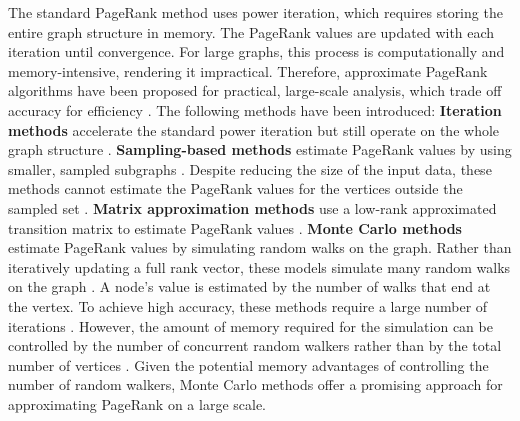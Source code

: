The standard PageRank method uses power iteration, which requires storing the entire graph structure in memory. The PageRank values are updated with each iteration until convergence. For large graphs, this process is computationally and memory-intensive, rendering it impractical. Therefore, approximate PageRank algorithms have been proposed for practical, large-scale analysis, which trade off accuracy for efficiency \cite{wu_efficient_2024}. The following methods have been introduced:
\textbf{Iteration methods} \cite{xie_parameterized_2023-1}\cite{anikin_efficient_2022} accelerate the standard power iteration but still operate on the whole graph structure \cite{wu_efficient_2024}. 
\textbf{Sampling-based methods} estimate PageRank values by using smaller, sampled subgraphs \cite{bar-yossef_local_2008}\cite{chen_local_2004}. Despite reducing the size of the input data, these methods cannot estimate the PageRank values for the vertices outside the sampled set \cite{wu_efficient_2024}.
\textbf{Matrix approximation methods} use a low-rank approximated transition matrix to estimate PageRank values \cite{liu_fast_2015}\cite{benczur_feasibility_2005}. 
\textbf{Monte Carlo methods} estimate PageRank values by simulating random walks on the graph. Rather than iteratively updating a full rank vector, these models simulate many random walks on the graph \cite{avrachenkov_monte_2007}. A node's value is estimated by the number of walks that end at the vertex. To achieve high accuracy, these methods require a large number of iterations \cite{wu_efficient_2024}. However, the amount of memory required for the simulation can be controlled by the number of concurrent random walkers rather than by the total number of vertices \cite{avrachenkov_monte_2007}. Given the potential memory advantages of controlling the number of random walkers, Monte Carlo methods offer a promising approach for approximating PageRank on a large scale.